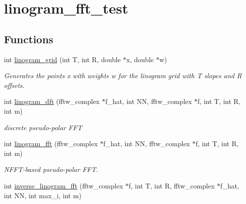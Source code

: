 \hypertarget{group__applications__polarFFT__linogramm}{
\section{linogram\_\-fft\_\-test}
\label{group__applications__polarFFT__linogramm}
}
\subsection*{Functions}
\begin{CompactItemize}
\item 
\hypertarget{group__applications__polarFFT__linogramm_ga1}{
int \hyperlink{group__applications__polarFFT__linogramm_ga1}{linogram\_\-grid} (int T, int R, double $\ast$x, double $\ast$w)}
\label{group__applications__polarFFT__linogramm_ga1}

\begin{CompactList}\small\item\em Generates the points x with weights w for the linogram grid with T slopes and R offsets. \item\end{CompactList}\item 
\hypertarget{group__applications__polarFFT__linogramm_ga2}{
int \hyperlink{group__applications__polarFFT__linogramm_ga2}{linogram\_\-dft} (fftw\_\-complex $\ast$f\_\-hat, int NN, fftw\_\-complex $\ast$f, int T, int R, int m)}
\label{group__applications__polarFFT__linogramm_ga2}

\begin{CompactList}\small\item\em discrete pseudo-polar FFT \item\end{CompactList}\item 
\hypertarget{group__applications__polarFFT__linogramm_ga3}{
int \hyperlink{group__applications__polarFFT__linogramm_ga3}{linogram\_\-fft} (fftw\_\-complex $\ast$f\_\-hat, int NN, fftw\_\-complex $\ast$f, int T, int R, int m)}
\label{group__applications__polarFFT__linogramm_ga3}

\begin{CompactList}\small\item\em NFFT-based pseudo-polar FFT. \item\end{CompactList}\item 
\hypertarget{group__applications__polarFFT__linogramm_ga4}{
int \hyperlink{group__applications__polarFFT__linogramm_ga4}{inverse\_\-linogram\_\-fft} (fftw\_\-complex $\ast$f, int T, int R, fftw\_\-complex $\ast$f\_\-hat, int NN, int max\_\-i, int m)}
\label{group__applications__polarFFT__linogramm_ga4}


\end{CompactItemize}
